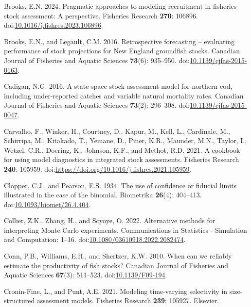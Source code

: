 \documentclass[
  12pt,
]{article}
\newlength{\cslhangindent}
\newenvironment{CSLReferences}[2] %
 {\begin{list}{}{%
  \setlength{\itemindent}{0pt}
  \setlength{\leftmargin}{0pt}
  \setlength{\parsep}{0pt}
  \ifodd #1
   \setlength{\leftmargin}{\cslhangindent}
   \setlength{\itemindent}{-1\cslhangindent}
  \fi
  \setlength{\itemsep}{#2\baselineskip}}}
 {\end{list}}
\begin{document}
\begin{CSLReferences}{1}{0}
Brooks, E.N. 2024. Pragmatic approaches to modeling recruitment in
fisheries stock assessment: A perspective. Fisheries Research
\textbf{270}: 106896.
doi:\href{https://doi.org/10.1016/j.fishres.2023.106896}{10.1016/j.fishres.2023.106896}.

Brooks, E.N., and Legault, C.M. 2016. Retrospective forecasting --
evaluating performance of stock projections for {N}ew {E}ngland
groundfish stocks. Canadian Journal of Fisheries and Aquatic Sciences
\textbf{73}(6): 935--950.
doi:\href{https://doi.org/10.1139/cjfas-2015-0163}{10.1139/cjfas-2015-0163}.

Cadigan, N.G. 2016. A state-space stock assessment model for northern
cod, including under-reported catches and variable natural mortality
rates. Canadian Journal of Fisheries and Aquatic Sciences
\textbf{73}(2): 296--308.
doi:\href{https://doi.org/10.1139/cjfas-2015-0047}{10.1139/cjfas-2015-0047}.

Carvalho, F., Winker, H., Courtney, D., Kapur, M., Kell, L., Cardinale,
M., Schirripa, M., Kitakado, T., Yemane, D., Piner, K.R., Maunder, M.N.,
Taylor, I., Wetzel, C.R., Doering, K., Johnson, K.F., and Methot, R.D.
2021. A cookbook for using model diagnostics in integrated stock
assessments. Fisheries Research \textbf{240}: 105959.
doi:\url{https://doi.org/10.1016/j.fishres.2021.105959}.

Clopper, C.J., and Pearson, E.S. 1934. The use of confidence or fiducial
limits illustrated in the case of the binomial. Biometrika
\textbf{26}(4): 404--413.
doi:\href{https://doi.org/10.1093/biomet/26.4.404}{10.1093/biomet/26.4.404}.

Collier, Z.K., Zhang, H., and Soyoye, O. 2022. Alternative methods for
interpreting {M}onte {C}arlo experiments. Communications in Statistics -
Simulation and Computation: 1--16.
doi:\href{https://doi.org/10.1080/03610918.2022.2082474}{10.1080/03610918.2022.2082474}.

Conn, P.B., Williams, E.H., and Shertzer, K.W. 2010. When can we
reliably estimate the productivity of fish stocks? Canadian Journal of
Fisheries and Aquatic Sciences \textbf{67}(3): 511--523.
doi:\href{https://doi.org/10.1139/F09-194}{10.1139/F09-194}.

Cronin-Fine, L., and Punt, A.E. 2021. Modeling time-varying selectivity
in size-structured assessment models. Fisheries Research \textbf{239}:
105927. Elsevier.


\end{CSLReferences}
\end{document}
